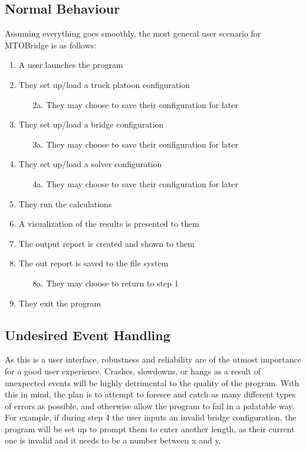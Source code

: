 \documentclass[12pt, titlepage]{article}
\begin{document}
\subsection{Normal Behaviour}
Assuming everything goes smoothly, the most general user scenario for MTOBridge is as follows:
\begin{enumerate}
\item A user launches the program
\item They set up/load a truck platoon configuration
    \begin{itemize}
        \item [2a.] They may choose to save their configuration for later
    \end{itemize}
\item They set up/load a bridge configuration
    \begin{itemize}
        \item [3a.] They may choose to save their configuration for later
    \end{itemize}
\item They set up/load a solver configuration
    \begin{itemize}
        \item [4a.] They may choose to save their configuration for later
    \end{itemize}
\item They run the calculations
\item A visualization of the results is presented to them
\item The output report is created and shown to them
\item The out report is saved to the file system
    \begin{itemize}
        \item [8a.] They may choose to return to step 1
    \end{itemize}
\item They exit the program
\end{enumerate}

\subsection{Undesired Event Handling}
As this is a user interface, robustness and reliability are of the utmost importance for a good user experience. Crashes, slowdowns, or hangs as a result of unexpected events will be highly detrimental to the quality of the program. With this in mind, the plan is to attempt to foresee and catch as many different types of errors as possible, and otherwise allow the program to fail in a palatable way. For example, if during step 4 the user inputs an invalid bridge configuration, the program will be set up to prompt them to enter another length, as their current one is invalid and it needs to be a number between x and y.
\end{document}
